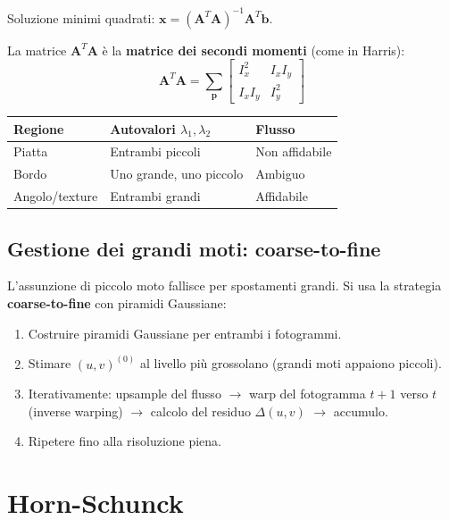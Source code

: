 \documentclass[12pt, a4paper]{report}
\begin{document}
Soluzione minimi quadrati: $\mathbf{x}=(\mathbf{A}^T\mathbf{A})^{-1}\mathbf{A}^T\mathbf{b}$.

La matrice $\mathbf{A}^T\mathbf{A}$ è la \textbf{matrice dei secondi momenti}
(come in Harris):
\[
  \mathbf{A}^T\mathbf{A}=\sum_{\mathbf{p}}\begin{bmatrix}I_x^2&I_xI_y\\I_xI_y&I_y^2\end{bmatrix}
\]

\begin{propbox}
\begin{center}
\begin{tabular}{lll}
\toprule
\textbf{Regione}&\textbf{Autovalori $\lambda_1,\lambda_2$}&\textbf{Flusso}\\
\midrule
Piatta    & Entrambi piccoli & Non affidabile\\
Bordo     & Uno grande, uno piccolo & Ambiguo\\
Angolo/texture & Entrambi grandi & Affidabile\\
\bottomrule
\end{tabular}
\end{center}
\end{propbox}

\subsection{Gestione dei grandi moti: coarse-to-fine}

L'assunzione di piccolo moto fallisce per spostamenti grandi. Si usa la strategia
\textbf{coarse-to-fine} con piramidi Gaussiane:

\begin{enumerate}
  \item Costruire piramidi Gaussiane per entrambi i fotogrammi.
  \item Stimare $(u,v)^{(0)}$ al livello più grossolano (grandi moti appaiono
        piccoli).
  \item Iterativamente: upsample del flusso $\to$ warp del fotogramma $t+1$
        verso $t$ (inverse warping) $\to$ calcolo del residuo $\Delta(u,v)$
        $\to$ accumulo.
  \item Ripetere fino alla risoluzione piena.
\end{enumerate}

\section{Horn-Schunck}
\end{document}
